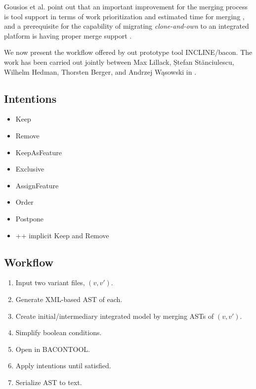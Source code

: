 Gousios et al. point out that an important improvement for the merging process is tool support in terms of work prioritization and estimated time for merging \cite{gousios2015}, and a prerequisite for the capability of migrating \textit{clone-and-own} to an integrated platform is having proper merge support \cite{antkiewicz2014flexible}.

We now present the workflow offered by out prototype tool INCLINE/bacon. The work has been carried out jointly between Max Lillack, Ștefan St\u{a}nciulescu, Wilhelm Hedman, Thorsten Berger, and Andrzej W\k{a}sowski in \cite{lillack2017intentions}.

\subsection{Intentions}
\begin{itemize}
    \item{Keep}
    \item{Remove}
    \item{KeepAsFeature}
    \item{Exclusive}
    \item{AssignFeature}
    \item{Order}
    \item{Postpone}
    \item{++ implicit Keep and Remove}
\end{itemize}

\subsection{Workflow}
\begin{enumerate}
    \item Input two variant files, $(v, v')$. 
    \item Generate XML-based AST of each.
    \item Create initial/intermediary integrated model by merging ASTs of $(v, v')$.
    \item Simplify boolean conditions.
    \item Open in BACONTOOL.
    \item Apply intentions until satisfied.
    \item Serialize AST to text.
\end{enumerate}
